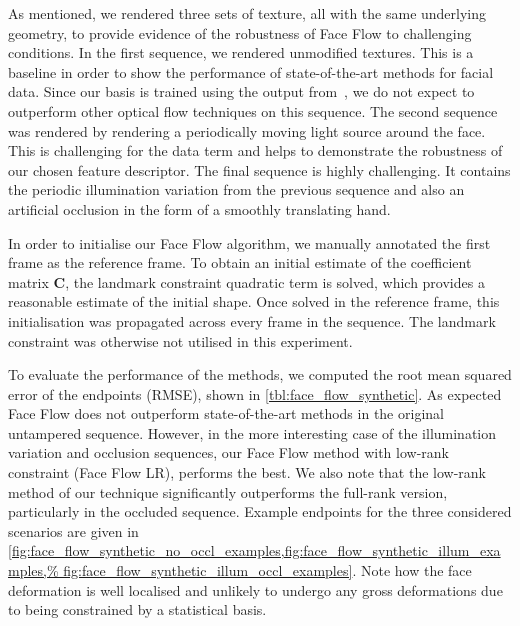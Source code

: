 As mentioned, we rendered three sets of texture, all with the same underlying geometry,
to provide evidence of the robustness of Face Flow to challenging conditions. In the first
sequence, we rendered unmodified textures. This is a baseline
in order to show the performance of state-of-the-art methods for facial data. Since
our basis is trained using the output from~\cite{garg2013variational}, we do not expect to
outperform other optical flow techniques on this sequence. The second sequence
was rendered by rendering a periodically moving light source around the face. This
is challenging for the data term and helps to demonstrate the
robustness of our chosen feature descriptor. The final sequence is highly challenging. It contains
the periodic illumination variation from the previous sequence and also an artificial
occlusion in the form of a smoothly translating hand.

In order to initialise our Face Flow algorithm, we manually annotated the first frame
as the reference frame. To obtain an initial estimate of the coefficient
matrix $\mathbf{C}$, the landmark constraint quadratic term is solved, which
provides a reasonable estimate of the initial shape. Once solved in the reference frame,
this initialisation was propagated across every frame in the sequence. The landmark constraint
was otherwise not utilised in this experiment.

To evaluate the performance of the methods, we computed the root mean squared
error of the endpoints (RMSE), shown in \cref{tbl:face_flow_synthetic}. As expected
Face Flow does not outperform state-of-the-art methods in the original untampered
sequence. However, in the more interesting case of the illumination variation
and occlusion sequences, our Face Flow method with low-rank constraint (Face Flow LR),
performs the best. We also note that the low-rank method of our technique significantly
outperforms the full-rank version, particularly in the occluded sequence.
Example endpoints for the three considered scenarios are given in
\cref{fig:face_flow_synthetic_no_occl_examples,fig:face_flow_synthetic_illum_examples,%
fig:face_flow_synthetic_illum_occl_examples}. Note how
the face deformation is well localised and unlikely to undergo any gross deformations
due to being constrained by a statistical basis.

